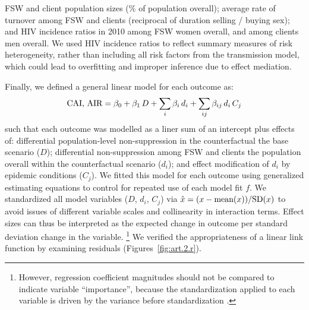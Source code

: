 FSW and client population sizes (\% of population overall);
average rate of turnover among FSW and clients (reciprocal of duration selling / buying sex); and
HIV incidence ratios in 2010 among FSW \vs women overall, and among clients \vs men overall.
We used HIV incidence ratios to reflect summary measures of risk heterogeneity,
rather than including all risk factors from the transmission model,
which could lead to overfitting and improper inference due to effect mediation.
\par
Finally, we defined a general linear model for each outcome as:
\begin{equation}\label{eq:art.2.glm}
  \textnormal{CAI, AIR} = \beta_0
                 + \beta_1\,D
                 + \sum_i \beta_i\,d_i
                 + \sum_{ij} \beta_{ij}\,d_i\,C_j
\end{equation}
such that each outcome was modelled as a liner sum of an intercept plus effects of:
differential population-level non-suppression in the counterfactual \vs the base scenario ($D$);
differential non-suppression among FSW and clients
\vs the population overall within the counterfactual scenario ($d_i$); and
effect modification of $d_i$ by epidemic conditions ($C_j$).
We fitted this model for each outcome using generalized estimating equations \cite{Hojsgaard2006}
to control for repeated use of each model fit $f$.
We standardized all model variables ($D$, $d_i$, $C_j$) via
$\hat{x} = (x - \textnormal{mean}(x)) / \textnormal{SD}(x)$
to avoid issues of different variable scales and collinearity in interaction terms.
Effect sizes can thus be interpreted as
the expected change in outcome per standard deviation change in the variable.%
\footnote{However, regression coefficient magnitudes
  should not be compared to indicate variable ``importance'',
  because the standardization applied to each variable
  is driven by the variance before standardization \cite{Rajerison2012}.}
We verified the appropriateness of a linear link function by examining residuals
(Figures~\ref{fig:art.2.r}).
